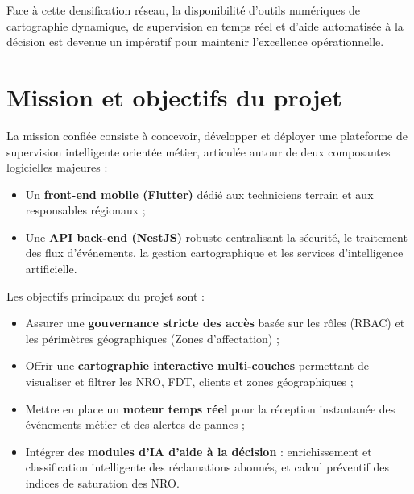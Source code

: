Face \`a cette densification r\'eseau, la disponibilit\'e d'outils num\'eriques de cartographie dynamique, de supervision en temps r\'eel et d'aide automatis\'ee \`a la d\'ecision est devenue un imp\'eratif pour maintenir l'excellence op\'erationnelle.

\section{Mission et objectifs du projet}
La mission confi\'ee consiste \`a concevoir, d\'evelopper et d\'eployer une plateforme de supervision intelligente orient\'ee m\'etier, articul\'ee autour de deux composantes logicielles majeures :
\begin{itemize}
    \item Un \textbf{front-end mobile (Flutter)} d\'edi\'e aux techniciens terrain et aux responsables r\'egionaux ;
    \item Une \textbf{API back-end (NestJS)} robuste centralisant la s\'ecurit\'e, le traitement des flux d'\'ev\'enements, la gestion cartographique et les services d'intelligence artificielle.
\end{itemize}

Les objectifs principaux du projet sont :
\begin{itemize}
    \item Assurer une \textbf{gouvernance stricte des acc\`es} bas\'ee sur les r\^oles (RBAC) et les p\'erim\`etres g\'eographiques (Zones d'affectation) ;
    \item Offrir une \textbf{cartographie interactive multi-couches} permettant de visualiser et filtrer les NRO, FDT, clients et zones g\'eographiques ;
    \item Mettre en place un \textbf{moteur temps r\'eel} pour la r\'eception instantan\'ee des \'ev\'enements m\'etier et des alertes de pannes ;
    \item Int\'egrer des \textbf{modules d'IA d'aide \`a la d\'ecision} : enrichissement et classification intelligente des r\'eclamations abonn\'es, et calcul pr\'eventif des indices de saturation des NRO.
\end{itemize}


